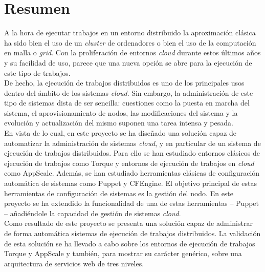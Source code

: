 \chapter{Resumen}
\label{cap:resumen}


A la hora de ejecutar trabajos en un entorno distribuido la aproximación clásica ha sido bien el uso de un \emph{cluster} de ordenadores o bien el uso de la computación en malla o \emph{grid}. Con la proliferación de entornos \emph{cloud} durante estos últimos años y su facilidad de uso, parece que una nueva opción se abre para la ejecución de este tipo de trabajos.\\

De hecho, la ejecución de trabajos distribuidos es uno de los principales usos dentro del ámbito de los sistemas \emph{cloud}. Sin embargo, la administración de este tipo de sistemas dista de ser sencilla: cuestiones como la puesta en marcha del sistema, el aprovisionamiento de nodos, las modificaciones del sistema y la evolución y actualización del mismo suponen una tarea intensa y pesada.\\

En vista de lo cual, en este proyecto se ha diseñado una solución capaz de automatizar la administración de sistemas \emph{cloud}, y en particular de un sistema de ejecución de trabajos distribuidos. Para ello se han estudiado entornos clásicos de ejecución de trabajos como Torque y entornos de ejecución de trabajos en \emph{cloud} como AppScale. Además, se han estudiado herramientas clásicas de configuración automática de sistemas como Puppet y CFEngine. El objetivo principal de estas herramientas de configuración de sistemas es la gestión del nodo. En este proyecto se ha extendido la funcionalidad de una de estas herramientas -- Puppet -- añadiéndole la capacidad de gestión de sistemas \emph{cloud}.\\

Como resultado de este proyecto se presenta una solución capaz de administrar de forma automática sistemas de ejecución de trabajos distribuidos. La validación de esta solución se ha llevado a cabo sobre los entornos de ejecución de trabajos Torque y AppScale y también, para mostrar su carácter genérico, sobre una arquitectura de servicios web de tres niveles.
